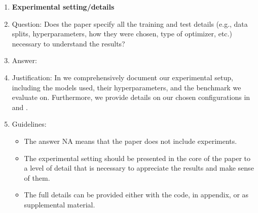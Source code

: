 \documentclass{article}
\begin{document}
\begin{enumerate}
\item {\bf Experimental setting/details}
    \item[] Question: Does the paper specify all the training and test details (e.g., data splits, hyperparameters, how they were chosen, type of optimizer, etc.) necessary to understand the results?
    \item[] Answer: \answerYes{}{} %
    \item[] Justification: In  we comprehensively document our experimental setup, including the models used, their hyperparameters, and the benchmark we evaluate on. Furthermore, we provide details on our chosen configurations in  and .
    \item[] Guidelines:
    \begin{itemize}
        \item The answer NA means that the paper does not include experiments.
        \item The experimental setting should be presented in the core of the paper to a level of detail that is necessary to appreciate the results and make sense of them.
        \item The full details can be provided either with the code, in appendix, or as supplemental material.
    \end{itemize}


\end{enumerate}
\end{document}
